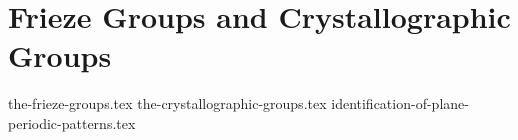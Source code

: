 \chapter{Frieze Groups and Crystallographic Groups}
{the-frieze-groups.tex}
{the-crystallographic-groups.tex}
{identification-of-plane-periodic-patterns.tex}
